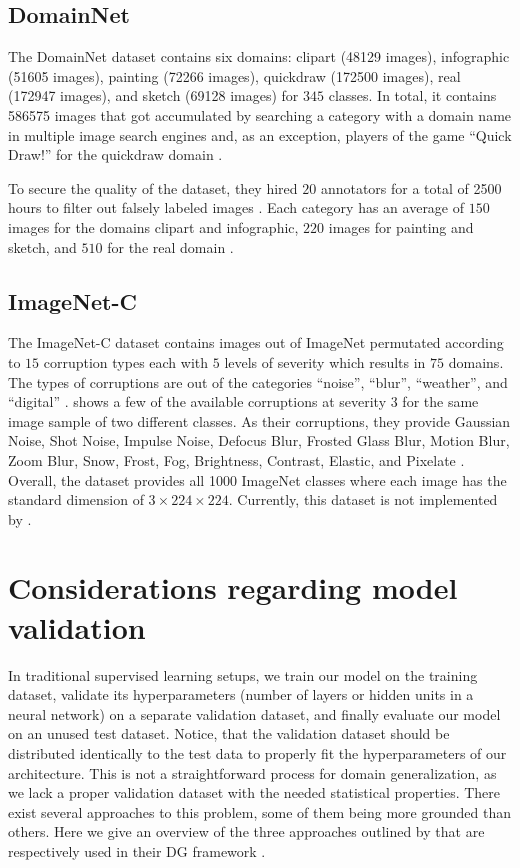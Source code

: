 \subsection{DomainNet}

The DomainNet dataset \citep{PengBXHSW19} contains six domains: clipart (\num{48129} images), infographic (\num{51605} images), painting (\num{72266} images), quickdraw (\num{172500} images), real (\num{172947} images), and sketch (\num{69128} images) for $345$ classes. In total, it contains \num{586575} images that got accumulated by searching a category with a domain name in multiple image search engines and, as an exception, players of the game ``Quick Draw!'' for the quickdraw domain \citep{PengBXHSW19}.

To secure the quality of the dataset, they hired $20$ annotators for a total of \num{2500} hours to filter out falsely labeled images \citep{PengBXHSW19}. Each category has an average of $150$ images for the domains clipart and infographic, $220$ images for painting and sketch, and $510$ for the real domain \citep{PengBXHSW19}.

\subsection{ImageNet-C}
The ImageNet-C dataset \citep{HendrycksD19} contains images out of ImageNet \citep{RussakovskyDSKS15} permutated according to $15$ corruption types each with $5$ levels of severity which results in $75$ domains. The types of corruptions are out of the categories ``noise'', ``blur'', ``weather'', and ``digital'' \citep{HendrycksD19}.  shows a few of the available corruptions at severity $3$ for the same image sample of two different classes. As their corruptions, they provide Gaussian Noise, Shot Noise, Impulse Noise, Defocus Blur, Frosted Glass Blur, Motion Blur, Zoom Blur, Snow, Frost, Fog, Brightness, Contrast, Elastic, and Pixelate \citep{HendrycksD19}. Overall, the dataset provides all \num{1000} ImageNet classes where each image has the standard dimension of $3 \times 224 \times 224$. Currently, this dataset is not implemented by \citet{gulrajani2020search}.

\section{Considerations regarding model validation}
\label{sec:considerations}

In traditional supervised learning setups, we train our model on the training dataset, validate its hyperparameters (\eg number of layers or hidden units in a neural network) on a separate validation dataset, and finally evaluate our model on an unused test dataset. Notice, that the validation dataset should be distributed identically to the test data to properly fit the hyperparameters of our architecture. This is not a straightforward process for domain generalization, as we lack a proper validation dataset with the needed statistical properties. There exist several approaches to this problem, some of them being more grounded than others. Here we give an overview of the three approaches outlined by \citet{gulrajani2020search} that are respectively used in their DG framework \domainbed. 


